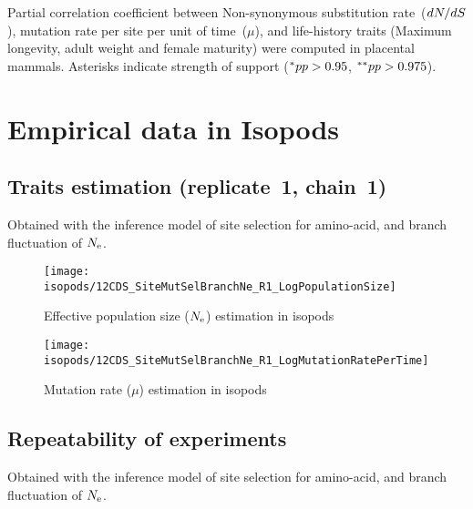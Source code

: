 \begin{table}[H]
    
    \caption[Partial correlation coefficient matrix in mammals ($\dnds$)]{
    Partial correlation coefficient between Non-synonymous \gls{substitution} rate~($\dnds$), mutation rate per site per unit of time~($\mu$), and life-history traits (Maximum longevity, adult weight and female maturity) were computed in placental mammals.
    Asterisks indicate strength of support ($\smash{^{*}} pp > 0.95$, $\smash{^{**}} pp > 0.975$).}
\end{table}


\section{Empirical data in Isopods}
\label{sec:empirical-data-in-isopods}

\subsection{Traits estimation (replicate~1, chain~1)}
Obtained with the inference model of site selection for amino-acid, and branch fluctuation of $\Ne$.

\begin{figure}[H]
    \centering
    \texttt{[image: isopods/12CDS\_SiteMutSelBranchNe\_R1\_LogPopulationSize]}
    \caption[$\Ne$ estimation in isopods]{Effective population size ($\Ne$) estimation in isopods}
\end{figure}

\begin{figure}[H]
    \centering
    \texttt{[image: isopods/12CDS\_SiteMutSelBranchNe\_R1\_LogMutationRatePerTime]}
    \caption[Mutation rate estimation in isopods]{Mutation rate ($\mu$) estimation in isopods}
\end{figure}

\subsection{Repeatability of experiments}
Obtained with the inference model of site selection for amino-acid, and branch fluctuation of $\Ne$.

